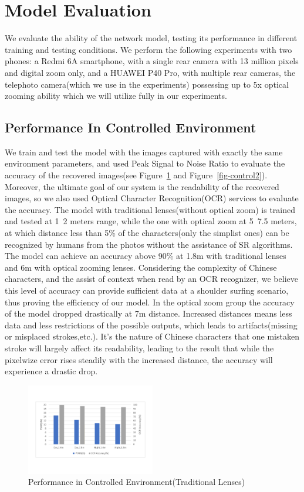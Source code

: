  
\section{Model Evaluation}
We evaluate the ability of the network model, testing its performance in different training and testing conditions. We perform the following experiments with two phones: a Redmi 6A smartphone, with a single rear camera with 13 million pixels and digital zoom only, and a HUAWEI P40 Pro, with multiple rear cameras, the telephoto camera(which we use in the experiments) possessing up to 5x optical zooming ability which we will utilize fully in our experiments. 
\subsection{Performance In Controlled Environment}
We train and test the model with the images captured with exactly the same environment parameters, and used Peak Signal to Noise Ratio to evaluate the accuracy of the recovered images(see Figure~\ref{fig-control} and Figure~\ref{fig-control2}). Moreover, the ultimate goal of our system is the readability of the recovered images, so we also used Optical Character Recognition(OCR) services to evaluate the accuracy. The model with traditional lenses(without optical zoom) is trained and tested at 1~2 meters range, while the one with optical zoom at 5~7.5 meters, at which distance less than 5\% of the characters(only the simplist ones) can be recognized by humans from the photos without the assistance of SR algorithms. The model can achieve an accuracy above 90\% at 1.8m with traditional lenses and 6m with optical zooming lenses. Considering the complexity of Chinese characters, and the assist of context when read by an OCR recognizer, we believe this level of accuracy can provide sufficient data at a shoulder surfing scenario, thus proving the efficiency of our model.
In the optical zoom group the accuracy of the model dropped drastically at 7m distance. Increased distances means less data and less restrictions of the possible outputs, which leads to artifacts(missing or misplaced strokes,etc.). It's the nature of Chinese characters that one mistaken stroke will largely affect its readability, leading to the result that while the pixelwize error rises steadily with the increased distance, the accuracy will experience a drastic drop.

\begin{figure}
 \centering
    \includegraphics[width=0.5\textwidth]{./pic/table1.pdf}
    \caption{Performance in Controlled Environment(Traditional Lenses)}
    \label{fig-control}
\end{figure}

